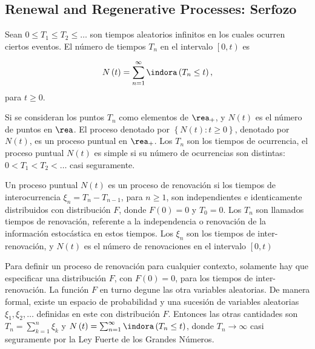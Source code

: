 \subsection{Renewal and Regenerative Processes: Serfozo\cite{Serfozo}}
\begin{Def}\label{Def.Tn}
Sean $0\leq T_{1}\leq T_{2}\leq \ldots$ son tiempos aleatorios infinitos en los cuales ocurren ciertos eventos. El n\'umero de tiempos $T_{n}$ en el intervalo $\left[0,t\right)$ es

\begin{eqnarray}
N\left(t\right)=\sum_{n=1}^{\infty}\indora\left(T_{n}\leq t\right),
\end{eqnarray}
para $t\geq0$.
\end{Def}

Si se consideran los puntos $T_{n}$ como elementos de $\rea_{+}$, y $N\left(t\right)$ es el n\'umero de puntos en $\rea$. El proceso denotado por $\left\{N\left(t\right):t\geq0\right\}$, denotado por $N\left(t\right)$, es un proceso puntual en $\rea_{+}$. Los $T_{n}$ son los tiempos de ocurrencia, el proceso puntual $N\left(t\right)$ es simple si su n\'umero de ocurrencias son distintas: $0<T_{1}<T_{2}<\ldots$ casi seguramente.

\begin{Def}
Un proceso puntual $N\left(t\right)$ es un proceso de renovaci\'on si los tiempos de interocurrencia $\xi_{n}=T_{n}-T_{n-1}$, para $n\geq1$, son independientes e identicamente distribuidos con distribuci\'on $F$, donde $F\left(0\right)=0$ y $T_{0}=0$. Los $T_{n}$ son llamados tiempos de renovaci\'on, referente a la independencia o renovaci\'on de la informaci\'on estoc\'astica en estos tiempos. Los $\xi_{n}$ son los tiempos de inter-renovaci\'on, y $N\left(t\right)$ es el n\'umero de renovaciones en el intervalo $\left[0,t\right)$
\end{Def}


\begin{Note}
Para definir un proceso de renovaci\'on para cualquier contexto, solamente hay que especificar una distribuci\'on $F$, con $F\left(0\right)=0$, para los tiempos de inter-renovaci\'on. La funci\'on $F$ en turno degune las otra variables aleatorias. De manera formal, existe un espacio de probabilidad y una sucesi\'on de variables aleatorias $\xi_{1},\xi_{2},\ldots$ definidas en este con distribuci\'on $F$. Entonces las otras cantidades son $T_{n}=\sum_{k=1}^{n}\xi_{k}$ y $N\left(t\right)=\sum_{n=1}^{\infty}\indora\left(T_{n}\leq t\right)$, donde $T_{n}\rightarrow\infty$ casi seguramente por la Ley Fuerte de los Grandes N\'umeros.
\end{Note}







